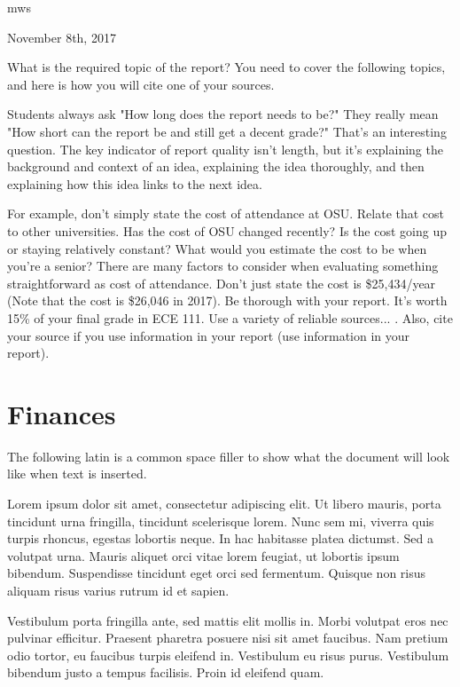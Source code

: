 \documentclass[journal]{IEEEtran}
\begin{document}
\hfill mws
 
\hfill November 8th, 2017

What is the required topic of the report?  You need to cover the following topics, and here is how you will cite one of your sources\cite{OSU2016}.

Students always ask "How long does the report needs to be?"  They really mean "How short can the report be and still get a decent grade?"  That's an interesting question.  The key indicator of report quality isn't length, but it's explaining the background and context of an idea, explaining the idea thoroughly, and then explaining how this idea links to the next idea.  

For example, don't simply state the cost of attendance at OSU.  Relate that cost to other universities.  Has the cost of OSU changed recently?  Is the cost going up or staying relatively constant?  What would you estimate the cost to be when you're a senior?  There are many factors to consider when evaluating something straightforward as cost of attendance.  Don't just state the cost is \$25,434/year\cite{OSU2016} (Note that the cost is \$26,046 in 2017).  Be thorough with your report.  It's worth 15\% of your final grade in ECE 111.  Use a variety of reliable sources...
\cite{HECC2015}\cite{DeptOfEdu2016}\cite{Gazette2012}\cite{OUS2013}\cite{TuitionHistory2017}.  Also, cite your source if you use information in your report (use information in your report).

\section{Finances}
The following latin is a common space filler to show what the document will look like when text is inserted.

Lorem ipsum dolor sit amet, consectetur adipiscing elit. Ut libero mauris, porta tincidunt urna fringilla, tincidunt scelerisque lorem. Nunc sem mi, viverra quis turpis rhoncus, egestas lobortis neque. In hac habitasse platea dictumst. Sed a volutpat urna. Mauris aliquet orci vitae lorem feugiat, ut lobortis ipsum bibendum. Suspendisse tincidunt eget orci sed fermentum. Quisque non risus aliquam risus varius rutrum id et sapien.

Vestibulum porta fringilla ante, sed mattis elit mollis in. Morbi volutpat eros nec pulvinar efficitur. Praesent pharetra posuere nisi sit amet faucibus. Nam pretium odio tortor, eu faucibus turpis eleifend in. Vestibulum eu risus purus. Vestibulum bibendum justo a tempus facilisis. Proin id eleifend quam.
\end{document}
